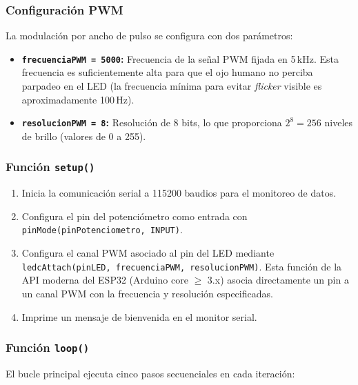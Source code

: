 \documentclass[12pt,a4paper]{article}
\begin{document}
\subsubsection*{Configuración PWM}
La modulación por ancho de pulso se configura con dos parámetros:
\begin{itemize}
    \item \textbf{\texttt{frecuenciaPWM = 5000}:} Frecuencia de la señal PWM fijada en 5\,kHz. Esta frecuencia es suficientemente alta para que el ojo humano no perciba parpadeo en el LED (la frecuencia mínima para evitar \textit{flicker} visible es aproximadamente 100\,Hz).
    \item \textbf{\texttt{resolucionPWM = 8}:} Resolución de 8 bits, lo que proporciona $2^8 = 256$ niveles de brillo (valores de 0 a 255).
\end{itemize}

\subsubsection*{Función \texttt{setup()}}
\begin{enumerate}
    \item Inicia la comunicación serial a 115200 baudios para el monitoreo de datos.
    \item Configura el pin del potenciómetro como entrada con \texttt{pinMode(pinPotenciometro, INPUT)}.
    \item Configura el canal PWM asociado al pin del LED mediante \texttt{ledcAttach(pinLED, frecuenciaPWM, resolucionPWM)}. Esta función de la API moderna del ESP32 (Arduino core $\geq$ 3.x) asocia directamente un pin a un canal PWM con la frecuencia y resolución especificadas.
    \item Imprime un mensaje de bienvenida en el monitor serial.
\end{enumerate}

\subsubsection*{Función \texttt{loop()}}
El bucle principal ejecuta cinco pasos secuenciales en cada iteración:
\end{document}
